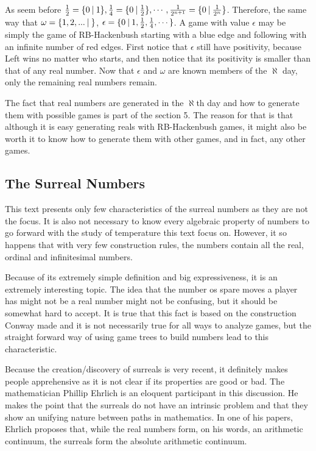 As seem before $\frac{1}{2} = \mbox{$\{0\:|\:1\}$}, \frac{1}{4} = \mbox{$\{0\:|\:\frac{1}{2}\}$}, \cdots, \frac{1}{2^{n+1}} = \mbox{$\{0\:|\:\frac{1}{2^n}\}$}$. Therefore, the same way that $\omega=\mbox{$\{1,2,...\:|\:\}$}$, $\epsilon=\mbox{$\{0\:|\:1,\frac{1}{2},\frac{1}{4},\cdots\}$}$. A game with value $\epsilon$ may be simply the game of RB-Hackenbush starting with a blue edge and following with an infinite number of red edges. First notice that $\epsilon$ still have positivity, because Left wins no matter who starts, and then notice that its positivity is smaller than that of any real number. Now that $\epsilon$ and $\omega$ are known members of the $\aleph$ day, only the remaining real numbers remain.

The fact that real numbers are generated in the $\aleph$th day and how to generate them with possible games is part of the section 5. The reason for that is that although it is easy generating reals with RB-Hackenbush games, it might also be worth it to know how to generate them with other games, and in fact, any other games.

\subsection*{The Surreal Numbers}

This text presents only few characteristics of the surreal numbers as they are not the focus. It is also not necessary to know every algebraic property of numbers to go forward with the study of temperature this text focus on. However, it so happens that with very few construction rules, the numbers contain all the real, ordinal and infinitesimal numbers.

Because of its extremely simple definition and big expressiveness, it is an extremely interesting topic. The idea that the number os spare moves a player has might not be a real number might not be confusing, but it should be somewhat hard to accept. It is true that this fact is based on the construction Conway made and it is not necessarily true for all ways to analyze games, but the straight forward way of using game trees to build numbers lead to this characteristic.

Because the creation/discovery of surreals is very recent, it definitely makes people apprehensive as it is not clear if its properties are good or bad. The mathematician Phillip Ehrlich is an eloquent participant in this discussion. He makes the point that the surreals do not have an intrinsic problem and that they show an unifying nature between paths in mathematics. In one of his papers, Ehrlich proposes that, while the real numbers form, on his words, an arithmetic continuum, the surreals form the absolute arithmetic continuum.

